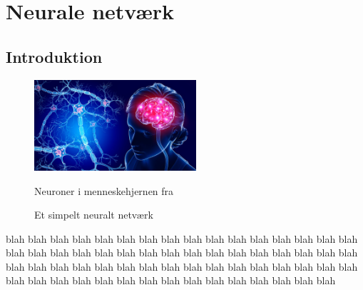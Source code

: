 \documentclass{article}
\begin{document}
\section{Neurale netværk}
\subsection{Introduktion}
\begin{figure}
  \includegraphics[width=6cm]{neurons.jpg}
  \caption{Neuroner i menneskehjernen fra \parencite{St_Clair_2021}}
  \vspace{0.5cm}
  
  \caption{Et simpelt neuralt netværk}
\end{figure}
blah blah blah blah blah blah blah blah blah blah blah blah blah blah blah blah blah blah blah blah blah blah blah blah blah blah blah blah blah blah blah blah blah blah blah blah blah blah blah blah blah blah blah blah blah blah blah blah blah blah blah blah blah blah blah blah blah blah blah blah blah blah blah 
\end{document}
